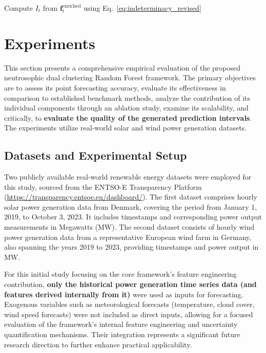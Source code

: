 \documentclass[review,3p,times]{elsarticle}
\begin{document}
\begin{algorithm}[t!]
\BlankLine
{}
Compute $I_t$ from $\mathbf{f}_t^{\text{enriched}}$ using Eq.~\ref{eq:indeterminacy_revised}\;

\end{algorithm}

\section{Experiments}
\label{sec:experiments}

This section presents a comprehensive empirical evaluation of the proposed neutrosophic dual clustering Random Forest framework. The primary objectives are to assess its point forecasting accuracy, evaluate its effectiveness in comparison to established benchmark methods, analyze the contribution of its individual components through an ablation study, examine its scalability, and critically, to \textbf{evaluate the quality of the generated prediction intervals}. The experiments utilize real-world solar and wind power generation datasets.

\subsection{Datasets and Experimental Setup}
\label{subsec:datasets_setup}

Two publicly available real-world renewable energy datasets were employed for this study, sourced from the ENTSO-E Transparency Platform (\url{https://transparency.entsoe.eu/dashboard/}). The first dataset comprises hourly solar power generation data from Denmark, covering the period from January 1, 2019, to October 3, 2023. It includes timestamps and corresponding power output measurements in Megawatts (MW). The second dataset consists of hourly wind power generation data from a representative European wind farm in Germany, also spanning the years 2019 to 2023, providing timestamps and power output in MW.

For this initial study focusing on the core framework's feature engineering contribution, \textbf{only the historical power generation time series data (and features derived internally from it)} were used as inputs for forecasting. Exogenous variables such as meteorological forecasts (temperature, cloud cover, wind speed forecasts) were not included as direct inputs, allowing for a focused evaluation of the framework's internal feature engineering and uncertainty quantification mechanisms. Their integration represents a significant future research direction to further enhance practical applicability.
\end{document}
